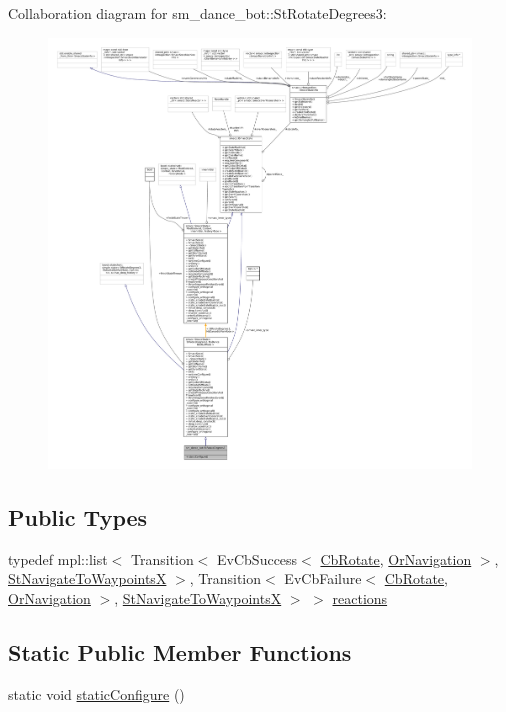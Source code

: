 Collaboration diagram for sm\+\_\+dance\+\_\+bot\+:\+:St\+Rotate\+Degrees3\+:
\nopagebreak
\begin{figure}[H]
\begin{center}
\leavevmode
\includegraphics[width=350pt]{structsm__dance__bot_1_1StRotateDegrees3__coll__graph}
\end{center}
\end{figure}
\subsection*{Public Types}
\begin{DoxyCompactItemize}
\item 
typedef mpl\+::list$<$ Transition$<$ Ev\+Cb\+Success$<$ \hyperlink{classcl__move__base__z_1_1CbRotate}{Cb\+Rotate}, \hyperlink{classsm__dance__bot_1_1OrNavigation}{Or\+Navigation} $>$, \hyperlink{structsm__dance__bot_1_1StNavigateToWaypointsX}{St\+Navigate\+To\+WaypointsX} $>$, Transition$<$ Ev\+Cb\+Failure$<$ \hyperlink{classcl__move__base__z_1_1CbRotate}{Cb\+Rotate}, \hyperlink{classsm__dance__bot_1_1OrNavigation}{Or\+Navigation} $>$, \hyperlink{structsm__dance__bot_1_1StNavigateToWaypointsX}{St\+Navigate\+To\+WaypointsX} $>$ $>$ \hyperlink{structsm__dance__bot_1_1StRotateDegrees3_a5ee2b598665a4c42a614c1f4dbe4e8cc}{reactions}
\end{DoxyCompactItemize}
\subsection*{Static Public Member Functions}
\begin{DoxyCompactItemize}
\item 
static void \hyperlink{structsm__dance__bot_1_1StRotateDegrees3_a8156b512fa51ed1be24f5099ee9481be}{static\+Configure} ()
\end{DoxyCompactItemize}
